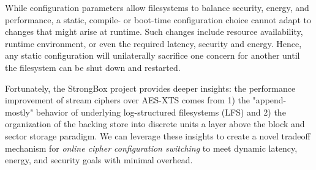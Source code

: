 While configuration parameters allow filesystems to balance security, energy,
and performance, a static,  compile- or boot-time configuration choice cannot
adapt to changes that might arise at runtime.  Such changes include resource
availability, runtime environment, or even the required latency, security and
energy. Hence, any static configuration will unilaterally sacrifice one concern
for another until the filesystem can be shut down and restarted.

Fortunately, the StrongBox project provides deeper insights: the performance
improvement of stream ciphers over AES-XTS comes from 1) the "append-mostly"
behavior of underlying log-structured filesystems (LFS) and 2) the organization
of the backing store into discrete units a layer above the block and sector
storage paradigm. We can leverage these insights to create a novel tradeoff
mechanism for \emph{online cipher configuration switching} to meet dynamic
latency, energy, and security goals with minimal overhead.


